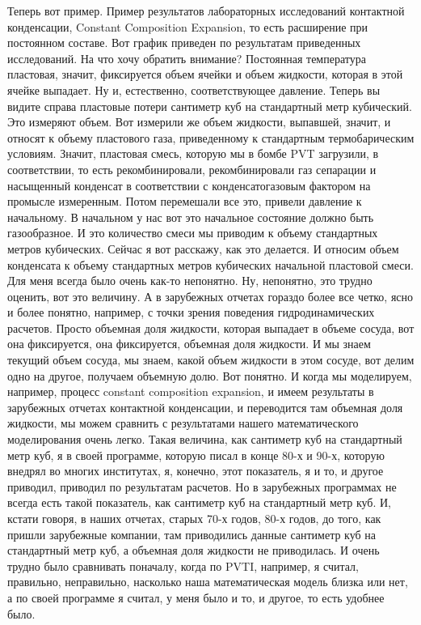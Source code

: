 \documentclass[main.tex]{subfiles}
\begin{document}
Теперь вот пример.
Пример результатов лабораторных исследований контактной конденсации, Constant Composition Expansion, то есть расширение при постоянном составе.
Вот график приведен по результатам приведенных исследований.
На что хочу обратить внимание?
Постоянная температура пластовая, значит, фиксируется объем ячейки и объем жидкости, которая в этой ячейке выпадает.
Ну и, естественно, соответствующее давление.
Теперь вы видите справа пластовые потери сантиметр куб на стандартный метр кубический.
Это измеряют объем.
Вот измерили же объем жидкости, выпавшей, значит, и относят к объему пластового газа, приведенному к стандартным термобарическим условиям.
Значит, пластовая смесь, которую мы в бомбе PVT загрузили, в соответствии, то есть рекомбинировали, рекомбинировали газ сепарации и насыщенный конденсат в соответствии с конденсатогазовым фактором на промысле измеренным.
Потом перемешали все это, привели давление к начальному.
В начальном у нас вот это начальное состояние должно быть газообразное.
И это количество смеси мы приводим к объему стандартных метров кубических.
Сейчас я вот расскажу, как это делается.
И относим объем конденсата к объему стандартных метров кубических начальной пластовой смеси.
Для меня всегда было очень как-то непонятно.
Ну, непонятно, это трудно оценить, вот это величину.
А в зарубежных отчетах гораздо более все четко, ясно и более понятно, например, с точки зрения поведения гидродинамических расчетов.
Просто объемная доля жидкости, которая выпадает в объеме сосуда, вот она фиксируется, она фиксируется, объемная доля жидкости.
И мы знаем текущий объем сосуда, мы знаем, какой объем жидкости в этом сосуде, вот делим одно на другое, получаем объемную долю.
Вот понятно.
И когда мы моделируем, например, процесс constant composition expansion, и имеем результаты в зарубежных отчетах контактной конденсации, и переводится там объемная доля жидкости, мы можем сравнить с результатами нашего математического моделирования очень легко.
Такая величина, как сантиметр куб на стандартный метр куб, я в своей программе, которую писал в конце 80-х и 90-х, которую внедрял во многих институтах, я, конечно, этот показатель, я и то, и другое приводил, приводил по результатам расчетов.
Но в зарубежных программах не всегда есть такой показатель, как сантиметр куб на стандартный метр куб.
И, кстати говоря, в наших отчетах, старых 70-х годов, 80-х годов, до того, как пришли зарубежные компании, там приводились данные сантиметр куб на стандартный метр куб, а объемная доля жидкости не приводилась.
И очень трудно было сравнивать поначалу, когда по PVTI, например, я считал, правильно, неправильно, насколько наша математическая модель близка или нет, а по своей программе я считал, у меня было и то, и другое, то есть удобнее было.
\end{document}
